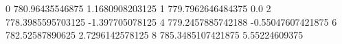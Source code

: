 0 780.96435546875 1.1680908203125
1 779.7962646484375 0.0
2 778.3985595703125 -1.397705078125
4 779.2457885742188 -0.55047607421875
6 782.52587890625 2.7296142578125
8 785.3485107421875 5.55224609375

